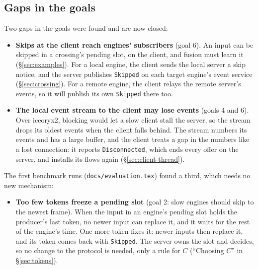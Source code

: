 \documentclass[11pt]{article}
\newcommand{\code}[1]{\texttt{#1}}
\begin{document}
\subsection{Gaps in the goals}

Two gaps in the goals were found and are now closed:
\begin{itemize}[nosep]
  \item \textbf{Skips at the client reach engines' subscribers} (goal 6). An
        input can be skipped in a crossing's pending slot, on the client, and
        fusion must learn it (\S\ref{sec:examples}). For a local engine, the
        client sends the local server a skip notice, and the server publishes
        \code{Skipped} on each target engine's event service
        (\S\ref{sec:crossing}). For a remote engine, the client relays the
        remote server's events, so it will publish its own \code{Skipped}
        there too.
  \item \textbf{The local event stream to the client may lose events} (goals
        4 and 6). Over iceoryx2, blocking would let a slow client stall the
        server, so the stream drops its oldest events when the client falls
        behind. The stream numbers its events and has a large buffer, and the
        client treats a gap in the numbers like a lost connection: it reports
        \code{Disconnected}, which ends every offer on the server, and installs
        its flows again (\S\ref{sec:client-thread}).
\end{itemize}

The first benchmark runs (\code{docs/evaluation.tex}) found a third, which
needs no new mechanism:
\begin{itemize}[nosep]
  \item \textbf{Too few tokens freeze a pending slot} (goal 2: slow engines
        should skip to the newest frame). When the input in an engine's
        pending slot holds the producer's last token, no newer input can
        replace it, and it waits for the rest of the engine's time. One more
        token fixes it: newer inputs then replace it, and its token comes
        back with \code{Skipped}. The server owns the slot and decides, so no
        change to the protocol is needed, only a rule for $C$ (``Choosing
        $C$'' in \S\ref{sec:tokens}).
\end{itemize}
\end{document}
